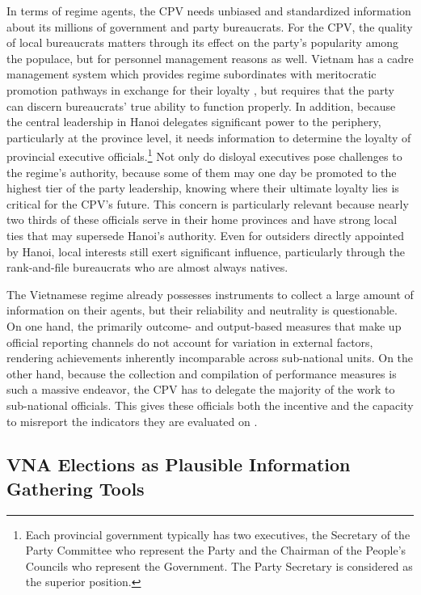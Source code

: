 \documentclass[12pt]{article}
\newcommand\fnote[1]{\footnote{\baselineskip=2\normalbaselineskip#1}}
\newcommand{\1}{\mathbbm{1}}
\begin{document}
In terms of regime agents, the CPV needs unbiased and standardized information about its millions of government and party bureaucrats. For the CPV, the quality of local bureaucrats matters through its effect on the party's popularity among the populace, but for personnel management reasons as well. Vietnam has a cadre management system which provides regime subordinates with meritocratic promotion pathways in exchange for their loyalty \citep{Svolik2012}, but requires that the party can discern bureaucrats' true ability to function properly. In addition, because the central leadership in Hanoi delegates significant power to the periphery, particularly at the province level, it needs information to determine the loyalty of provincial executive officials.\fnote{Each provincial government typically has two executives, the Secretary of the Party Committee who represent the Party and the Chairman of the People's Councils who represent the Government. The Party Secretary is considered as the superior position.} Not only do disloyal executives pose challenges to the regime's authority, because some of them may one day be promoted to the highest tier of the party leadership, knowing where their ultimate loyalty lies is critical for the CPV's future. This concern is particularly relevant because nearly two thirds of these officials serve in their home provinces and have strong local ties that may supersede Hanoi's authority. %
Even for outsiders directly appointed by Hanoi, local interests still exert significant influence, particularly through the rank-and-file bureaucrats who are almost always natives.

The Vietnamese regime already possesses instruments to collect a large amount of information on their agents, but their reliability and neutrality is questionable. On one hand, the primarily outcome- and output-based measures that make up official reporting channels do not account for variation in external factors, rendering achievements inherently incomparable across sub-national units. On the other hand, because the collection and compilation of performance measures is such a massive endeavor, the CPV has to delegate the majority of the work to sub-national officials. This gives these officials both the incentive and the capacity to misreport the indicators they are evaluated on \citep[][Ch. 8]{JensenMalesky2018}.

\subsection{VNA Elections as Plausible Information Gathering Tools}
\end{document}
